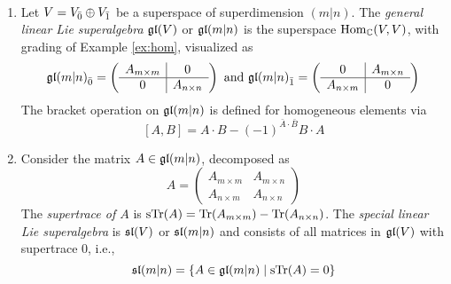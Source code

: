 \filbreak
\begin{example}~
  \begin{enumerate}
    \item Let $V = \even{V} \oplus \odd{V}$ be a superspace of superdimension $(m|n)$. The \emph{general linear Lie superalgebra} $\gl(V)$ or $\gl(m|n)$ is the superspace $\Hom_\CC(V,V)$, with grading of Example \ref{ex:hom}, visualized as
  \[
    \even{\gl(m|n)} =
    \left(
      \begin{array}{c|c}
        A_{m \times m} & 0 \\
        \hline
        0 & A_{n \times n}
      \end{array}
    \right)
    \text{ and }
    \odd{\gl(m|n)} =
    \left(
      \begin{array}{c|c}
        0 & A_{m \times n} \\
        \hline
        A_{n \times m} & 0
      \end{array}
    \right)
  \]
  The bracket operation on $\gl(m|n)$ is defined for homogeneous elements via
  \begin{equation} \label{eq:gl-bracket}
    [A,B] = A \cdot B - (-1)^{\bar A \cdot \bar B} B \cdot A
  \end{equation}
  \item Consider the matrix $A \in \gl(m|n)$, decomposed as
  \[
    A = 
    \left(
      \begin{array}{c|c}
        A_{m \times m} & A_{m \times n} \\
        \hline
        A_{n \times m} & A_{n \times n}
      \end{array}
    \right)
  \]
  The \emph{supertrace of $A$} is $\sTr(A) = \Tr(A_{m \times m}) - \Tr(A_{n \times n})$. The \emph{special linear Lie superalgebra} is $\sl(V)$ or $\sl(m|n)$ and consists of all matrices in $\gl(V)$ with supertrace 0, i.e.,
  \[
    \sl(m|n) = \left\{ A \in \gl(m|n) \mid \sTr(A) = 0 \right\}
  \]
\end{enumerate}
\end{example}

